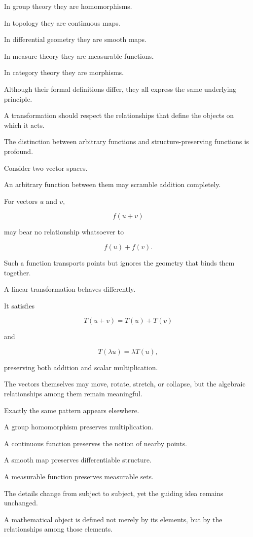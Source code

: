 \documentclass[11pt]{book}
\numberwithin{equation}{chapter}
\theoremstyle{definition}
\theoremstyle{plain}
\theoremstyle{remark}
\begin{document}
In group theory they are homomorphisms.

In topology they are continuous maps.

In differential geometry they are smooth maps.

In measure theory they are measurable functions.

In category theory they are morphisms.

Although their formal definitions differ, they all express the same underlying principle.

A transformation should respect the relationships that define the objects on which it acts.

The distinction between arbitrary functions and structure-preserving functions is profound.

Consider two vector spaces.

An arbitrary function between them may scramble addition completely.

For vectors \(u\) and \(v\),

\[
f(u+v)
\]

may bear no relationship whatsoever to

\[
f(u)+f(v).
\]

Such a function transports points but ignores the geometry that binds them together.

A linear transformation behaves differently.

It satisfies

\[
T(u+v)=T(u)+T(v)
\]

and

\[
T(\lambda u)=\lambda T(u),
\]

preserving both addition and scalar multiplication.

The vectors themselves may move, rotate, stretch, or collapse, but the algebraic relationships among them remain meaningful.

Exactly the same pattern appears elsewhere.

A group homomorphism preserves multiplication.

A continuous function preserves the notion of nearby points.

A smooth map preserves differentiable structure.

A measurable function preserves measurable sets.

The details change from subject to subject, yet the guiding idea remains unchanged.

A mathematical object is defined not merely by its elements, but by the relationships among those elements.
\end{document}
